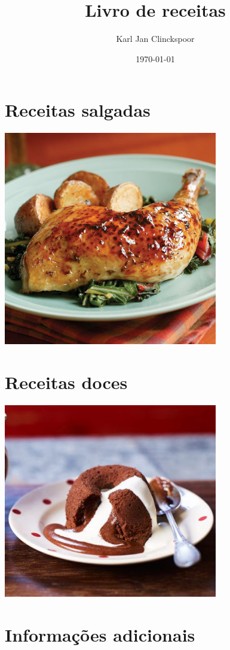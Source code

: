 \documentclass{book}
\title{Livro de receitas} \author{Karl Jan Clinckspoor} \date{\today}
\begin{document}
\maketitle
\tableofcontents

\chapter{Receitas salgadas}
\begin{center}
	\includegraphics[width=0.7\textwidth]{./Fotos/foto_savory}\end{center}
\clearpage


\chapter{Receitas doces}
\begin{center}
	\includegraphics[width=0.7\textwidth]{Fotos/foto_sweet} \end{center}
\clearpage


\chapter{Informações adicionais}


\end{document}

